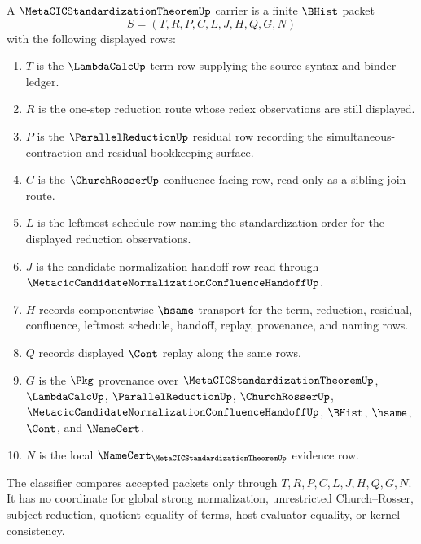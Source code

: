 \begin{definition}
\label{def:metacic-standardization-theorem-carrier}
A $\MetaCICStandardizationTheoremUp$ carrier is a finite $\BHist$ packet
$$
S=(T,R,P,C,L,J,H,Q,G,N)
$$
with the following displayed rows:
\begin{enumerate}
\item $T$ is the $\LambdaCalcUp$ term row supplying the source syntax and binder ledger.
\item $R$ is the one-step reduction route whose redex observations are still displayed.
\item $P$ is the $\ParallelReductionUp$ residual row recording the simultaneous-contraction and residual bookkeeping surface.
\item $C$ is the $\ChurchRosserUp$ confluence-facing row, read only as a sibling join route.
\item $L$ is the leftmost schedule row naming the standardization order for the displayed reduction observations.
\item $J$ is the candidate-normalization handoff row read through $\MetacicCandidateNormalizationConfluenceHandoffUp$.
\item $H$ records componentwise $\hsame$ transport for the term, reduction, residual, confluence, leftmost schedule, handoff, replay, provenance, and naming rows.
\item $Q$ records displayed $\Cont$ replay along the same rows.
\item $G$ is the $\Pkg$ provenance over $\MetaCICStandardizationTheoremUp$, $\LambdaCalcUp$, $\ParallelReductionUp$, $\ChurchRosserUp$, $\MetacicCandidateNormalizationConfluenceHandoffUp$, $\BHist$, $\hsame$, $\Cont$, and $\NameCert$.
\item $N$ is the local $\NameCert_{\MetaCICStandardizationTheoremUp}$ evidence row.
\end{enumerate}
The classifier compares accepted packets only through $T,R,P,C,L,J,H,Q,G,N$. It has no coordinate for global strong normalization, unrestricted Church--Rosser, subject reduction, quotient equality of terms, host evaluator equality, or kernel consistency.
\end{definition}

